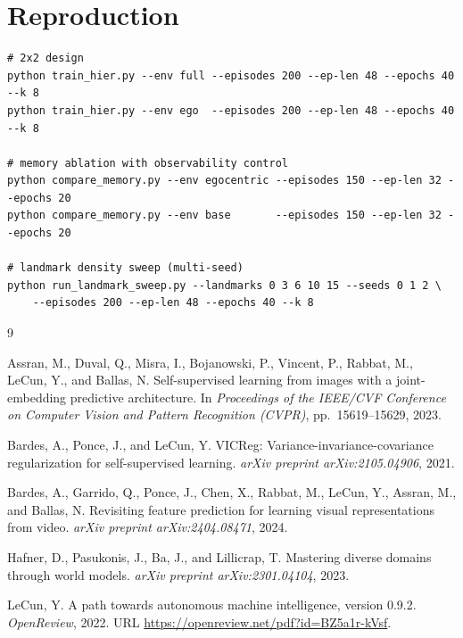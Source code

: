 \documentclass[11pt]{article}
\begin{document}
\appendix
\section{Reproduction}

\begin{verbatim}
# 2x2 design
python train_hier.py --env full --episodes 200 --ep-len 48 --epochs 40 --k 8
python train_hier.py --env ego  --episodes 200 --ep-len 48 --epochs 40 --k 8

# memory ablation with observability control
python compare_memory.py --env egocentric --episodes 150 --ep-len 32 --epochs 20
python compare_memory.py --env base       --episodes 150 --ep-len 32 --epochs 20

# landmark density sweep (multi-seed)
python run_landmark_sweep.py --landmarks 0 3 6 10 15 --seeds 0 1 2 \
    --episodes 200 --ep-len 48 --epochs 40 --k 8
\end{verbatim}


\begin{thebibliography}{9}

Assran, M., Duval, Q., Misra, I., Bojanowski, P., Vincent, P., Rabbat, M., LeCun, Y., and Ballas, N.
\newblock Self-supervised learning from images with a joint-embedding predictive architecture.
\newblock In \emph{Proceedings of the IEEE/CVF Conference on Computer Vision and Pattern Recognition (CVPR)}, pp.\ 15619--15629, 2023.

Bardes, A., Ponce, J., and LeCun, Y.
\newblock VICReg: Variance-invariance-covariance regularization for self-supervised learning.
\newblock \emph{arXiv preprint arXiv:2105.04906}, 2021.

Bardes, A., Garrido, Q., Ponce, J., Chen, X., Rabbat, M., LeCun, Y., Assran, M., and Ballas, N.
\newblock Revisiting feature prediction for learning visual representations from video.
\newblock \emph{arXiv preprint arXiv:2404.08471}, 2024.

Hafner, D., Pasukonis, J., Ba, J., and Lillicrap, T.
\newblock Mastering diverse domains through world models.
\newblock \emph{arXiv preprint arXiv:2301.04104}, 2023.

LeCun, Y.
\newblock A path towards autonomous machine intelligence, version 0.9.2.
\newblock \emph{OpenReview}, 2022.
\newblock URL \url{https://openreview.net/pdf?id=BZ5a1r-kVsf}.

\end{thebibliography}
\end{document}
